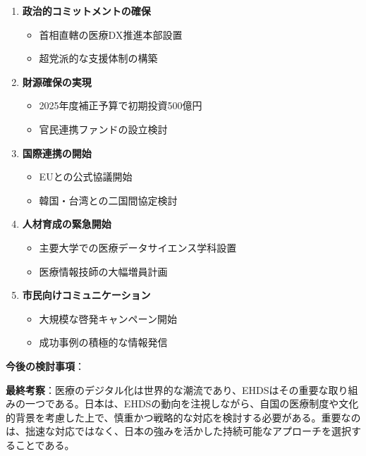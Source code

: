 \documentclass[
  a4paper,
  a4paper,
  11pt]{ltjsbook}
\providecommand{\tightlist}{%
  \setlength{\itemsep}{0pt}\setlength{\parskip}{0pt}}
\begin{document}
\begin{enumerate}
\def\labelenumi{\arabic{enumi}.}
\tightlist
\item
  \textbf{政治的コミットメントの確保}

  \begin{itemize}
  \tightlist
  \item
    首相直轄の医療DX推進本部設置
  \item
    超党派的な支援体制の構築
  \end{itemize}
\item
  \textbf{財源確保の実現}

  \begin{itemize}
  \tightlist
  \item
    2025年度補正予算で初期投資500億円
  \item
    官民連携ファンドの設立検討
  \end{itemize}
\item
  \textbf{国際連携の開始}

  \begin{itemize}
  \tightlist
  \item
    EUとの公式協議開始
  \item
    韓国・台湾との二国間協定検討
  \end{itemize}
\item
  \textbf{人材育成の緊急開始}

  \begin{itemize}
  \tightlist
  \item
    主要大学での医療データサイエンス学科設置
  \item
    医療情報技師の大幅増員計画
  \end{itemize}
\item
  \textbf{市民向けコミュニケーション}

  \begin{itemize}
  \tightlist
  \item
    大規模な啓発キャンペーン開始
  \item
    成功事例の積極的な情報発信
  \end{itemize}
\end{enumerate}

\textbf{今後の検討事項}：

\textbf{最終考察}：医療のデジタル化は世界的な潮流であり、EHDSはその重要な取り組みの一つである。日本は、EHDSの動向を注視しながら、自国の医療制度や文化的背景を考慮した上で、慎重かつ戦略的な対応を検討する必要がある。重要なのは、拙速な対応ではなく、日本の強みを活かした持続可能なアプローチを選択することである。
\end{document}
